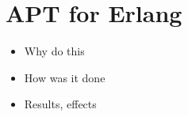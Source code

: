 \section{APT for Erlang}

\begin{itemize}
	\item Why do this
	\item How was it done 
	\item Results, effects 
\end{itemize}
